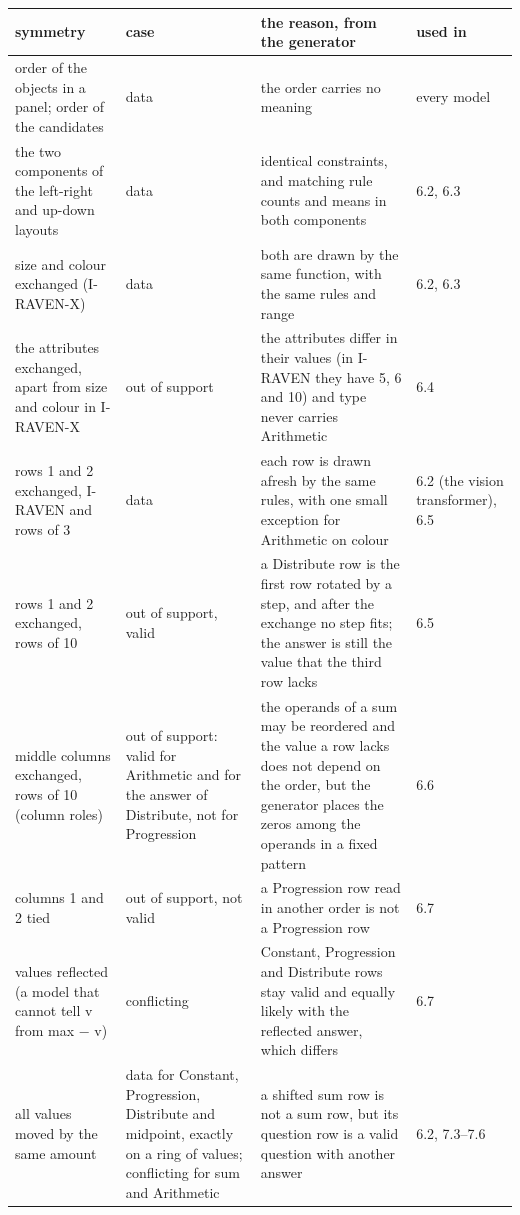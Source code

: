 \begin{center}\small
\begin{tabularx}{\linewidth}{@{}YYYY@{}}
\toprule
symmetry & case & the reason, from the generator & used in \\
\midrule
order of the objects in a panel; order of the candidates & data & the order carries no meaning & every model \\
the two components of the left-right and up-down layouts & data & identical constraints, and matching rule counts and means in both components & 6.2, 6.3 \\
size and colour exchanged (I-RAVEN-X) & data & both are drawn by the same function, with the same rules and range & 6.2, 6.3 \\
the attributes exchanged, apart from size and colour in I-RAVEN-X & out of support & the attributes differ in their values (in I-RAVEN they have 5, 6 and 10) and type never carries Arithmetic & 6.4 \\
rows 1 and 2 exchanged, I-RAVEN and rows of 3 & data & each row is drawn afresh by the same rules, with one small exception for Arithmetic on colour & 6.2 (the vision transformer), 6.5 \\
rows 1 and 2 exchanged, rows of 10 & out of support, valid & a Distribute row is the first row rotated by a step, and after the exchange no step fits; the answer is still the value that the third row lacks & 6.5 \\
middle columns exchanged, rows of 10 (column roles) & out of support: valid for Arithmetic and for the answer of Distribute, not for Progression & the operands of a sum may be reordered and the value a row lacks does not depend on the order, but the generator places the zeros among the operands in a fixed pattern & 6.6 \\
columns 1 and 2 tied & out of support, not valid & a Progression row read in another order is not a Progression row & 6.7 \\
values reflected (a model that cannot tell v from max − v) & conflicting & Constant, Progression and Distribute rows stay valid and equally likely with the reflected answer, which differs & 6.7 \\
all values moved by the same amount & data for Constant, Progression, Distribute and midpoint, exactly on a ring of values; conflicting for sum and Arithmetic & a shifted sum row is not a sum row, but its question row is a valid question with another answer & 6.2, 7.3–7.6 \\
\bottomrule
\end{tabularx}
\end{center}

